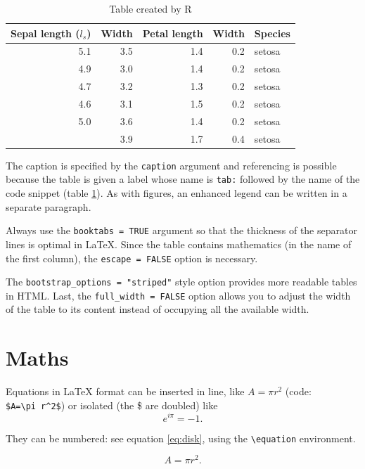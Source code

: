 \documentclass[
  12pt,
  american,
  a4paper,
  extrafontsizes,onecolumn,openright
  ]{memoir}
\begin{document}
\begin{table}

\caption{\label{tab:kable}Table created by R}
\centering
\begin{tabular}[t]{rrrrl}
\toprule
Sepal length ($l_s$) & Width & Petal length & Width & Species\\
\midrule
5.1 & 3.5 & 1.4 & 0.2 & setosa\\
4.9 & 3.0 & 1.4 & 0.2 & setosa\\
4.7 & 3.2 & 1.3 & 0.2 & setosa\\
4.6 & 3.1 & 1.5 & 0.2 & setosa\\
5.0 & 3.6 & 1.4 & 0.2 & setosa\\
\addlinespace
5.4 & 3.9 & 1.7 & 0.4 & setosa\\
\bottomrule
\end{tabular}
\end{table}

\normalsize

The caption is specified by the \texttt{caption} argument and referencing is possible because the table is given a label whose name is \texttt{tab:} followed by the name of the code snippet (table \ref{tab:kable}).
As with figures, an enhanced legend can be written in a separate paragraph.

Always use the \texttt{booktabs\ =\ TRUE} argument so that the thickness of the separator lines is optimal in LaTeX.
Since the table contains mathematics (in the name of the first column), the \texttt{escape\ =\ FALSE} option is necessary.

The \texttt{bootstrap\_options\ =\ "striped"} style option provides more readable tables in HTML.
Last, the \texttt{full\_width\ =\ FALSE} option allows you to adjust the width of the table to its content instead of occupying all the available width.

\hypertarget{maths}{%
\section{Maths}\label{maths}}

Equations in LaTeX format can be inserted in line, like \(A=\pi r^2\) (code: \texttt{\$A=\textbackslash{}pi\ r\^{}2\$}) or isolated (the \$ are doubled) like \[e^{i \pi} = -1.\]

They can be numbered: see equation \eqref{eq:disk}, using the \texttt{\textbackslash{}equation} environment.

\begin{equation}
  A = \pi r^2.
  \label{eq:disk}
\end{equation}
\end{document}
